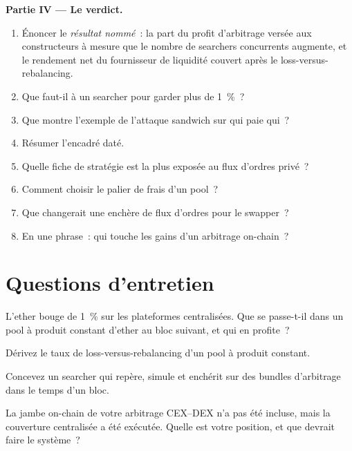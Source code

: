 \begin{problem}
\medskip\noindent\textbf{Partie IV --- Le verdict.}
\begin{enumerate}[resume]
\item Énoncer le \emph{résultat nommé}~: la part du profit d'arbitrage versée aux constructeurs à mesure que le nombre de searchers concurrents augmente, et le
rendement net du fournisseur de liquidité couvert après le loss-versus-rebalancing.
\item Que faut-il à un searcher pour garder plus de 1~\%~?
\item Que montre l'exemple de l'attaque sandwich sur qui paie qui~?
\item Résumer l'encadré daté.
\item Quelle fiche de stratégie est la plus exposée au flux d'ordres privé~?
\item Comment choisir le palier de frais d'un pool~?
\item Que changerait une enchère de flux d'ordres pour le swapper~?
\item En une phrase~: qui touche les gains d'un arbitrage on-chain~?
\end{enumerate}
\end{problem}

\section{Questions d'entretien}

\begin{interviewq}\label{iq:hf:on-chain-trading:1}
L'ether bouge de 1~\% sur les plateformes centralisées. Que se passe-t-il dans un pool à produit constant d'ether au bloc suivant, et qui en profite~?
\end{interviewq}

\begin{interviewq}\label{iq:hf:on-chain-trading:2}
Dérivez le taux de loss-versus-rebalancing d'un pool à produit constant.
\end{interviewq}

\begin{interviewq}\label{iq:hf:on-chain-trading:3}
Concevez un searcher qui repère, simule et enchérit sur des bundles d'arbitrage dans le temps d'un bloc.
\end{interviewq}

\begin{interviewq}\label{iq:hf:on-chain-trading:4}
La jambe on-chain de votre arbitrage CEX--DEX n'a pas été incluse, mais la couverture centralisée a été exécutée. Quelle est votre position, et que devrait faire le système~?
\end{interviewq}

